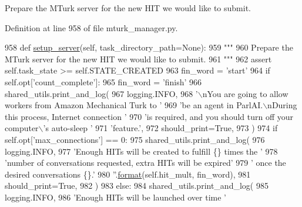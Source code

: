 \begin{DoxyVerb}Prepare the MTurk server for the new HIT we would like to submit.
\end{DoxyVerb}
 

Definition at line 958 of file mturk\+\_\+manager.\+py.


\begin{DoxyCode}
958     \textcolor{keyword}{def }\hyperlink{namespaceparlai_1_1chat__service_1_1services_1_1messenger_1_1server__utils_afb56b04206cd0f42384438f1ac6d9cda}{setup\_server}(self, task\_directory\_path=None):
959         \textcolor{stringliteral}{"""}
960 \textcolor{stringliteral}{        Prepare the MTurk server for the new HIT we would like to submit.}
961 \textcolor{stringliteral}{        """}
962         \textcolor{keyword}{assert} self.task\_state >= self.STATE\_CREATED
963         fin\_word = \textcolor{stringliteral}{'start'}
964         \textcolor{keywordflow}{if} self.opt[\textcolor{stringliteral}{'count\_complete'}]:
965             fin\_word = \textcolor{stringliteral}{'finish'}
966         shared\_utils.print\_and\_log(
967             logging.INFO,
968             \textcolor{stringliteral}{'\(\backslash\)nYou are going to allow workers from Amazon Mechanical Turk to '}
969             \textcolor{stringliteral}{'be an agent in ParlAI.\(\backslash\)nDuring this process, Internet connection '}
970             \textcolor{stringliteral}{'is required, and you should turn off your computer\(\backslash\)'s auto-sleep '}
971             \textcolor{stringliteral}{'feature.'},
972             should\_print=\textcolor{keyword}{True},
973         )
974         \textcolor{keywordflow}{if} self.opt[\textcolor{stringliteral}{'max\_connections'}] == 0:
975             shared\_utils.print\_and\_log(
976                 logging.INFO,
977                 \textcolor{stringliteral}{'Enough HITs will be created to fulfill \{\} times the '}
978                 \textcolor{stringliteral}{'number of conversations requested, extra HITs will be expired'}
979                 \textcolor{stringliteral}{' once the desired conversations \{\}.'}
980                 \textcolor{stringliteral}{''}.\hyperlink{namespaceparlai_1_1chat__service_1_1services_1_1messenger_1_1shared__utils_a32e2e2022b824fbaf80c747160b52a76}{format}(self.hit\_mult, fin\_word),
981                 should\_print=\textcolor{keyword}{True},
982             )
983         \textcolor{keywordflow}{else}:
984             shared\_utils.print\_and\_log(
985                 logging.INFO,
986                 \textcolor{stringliteral}{'Enough HITs will be launched over time '}

\end{DoxyCode}
